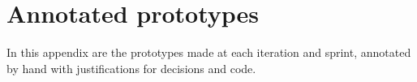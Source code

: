 \chapter{Annotated prototypes}

In this appendix are the prototypes made at each iteration and sprint, annotated by hand with justifications for decisions and code.